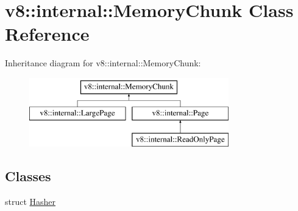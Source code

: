 \hypertarget{classv8_1_1internal_1_1MemoryChunk}{}\section{v8\+:\+:internal\+:\+:Memory\+Chunk Class Reference}
\label{classv8_1_1internal_1_1MemoryChunk}
Inheritance diagram for v8\+:\+:internal\+:\+:Memory\+Chunk\+:\begin{figure}[H]
\begin{center}
\leavevmode
\includegraphics[height=3.000000cm]{classv8_1_1internal_1_1MemoryChunk}
\end{center}
\end{figure}
\subsection*{Classes}
\begin{DoxyCompactItemize}
\item 
struct \mbox{\hyperlink{structv8_1_1internal_1_1MemoryChunk_1_1Hasher}{Hasher}}
\end{DoxyCompactItemize}
